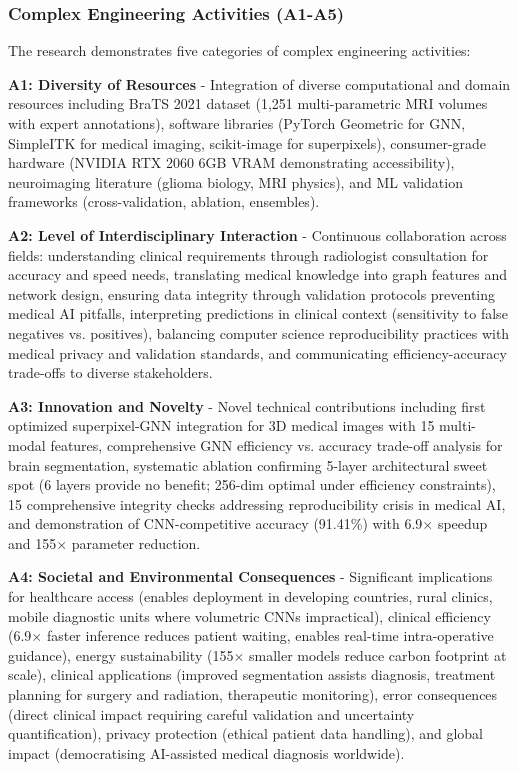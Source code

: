 \subsubsection{Complex Engineering Activities (A1-A5)}

The research demonstrates five categories of complex engineering activities:

\textbf{A1: Diversity of Resources} - Integration of diverse computational and domain resources including BraTS 2021 dataset (1,251 multi-parametric MRI volumes with expert annotations), software libraries (PyTorch Geometric for GNN, SimpleITK for medical imaging, scikit-image for superpixels), consumer-grade hardware (NVIDIA RTX 2060 6GB VRAM demonstrating accessibility), neuroimaging literature (glioma biology, MRI physics), and ML validation frameworks (cross-validation, ablation, ensembles).

\textbf{A2: Level of Interdisciplinary Interaction} - Continuous collaboration across fields: understanding clinical requirements through radiologist consultation for accuracy and speed needs, translating medical knowledge into graph features and network design, ensuring data integrity through validation protocols preventing medical AI pitfalls, interpreting predictions in clinical context (sensitivity to false negatives vs. positives), balancing computer science reproducibility practices with medical privacy and validation standards, and communicating efficiency-accuracy trade-offs to diverse stakeholders.

\textbf{A3: Innovation and Novelty} - Novel technical contributions including first optimized superpixel-GNN integration for 3D medical images with 15 multi-modal features, comprehensive GNN efficiency vs. accuracy trade-off analysis for brain segmentation, systematic ablation confirming 5-layer architectural sweet spot (6 layers provide no benefit; 256-dim optimal under efficiency constraints), 15 comprehensive integrity checks addressing reproducibility crisis in medical AI, and demonstration of CNN-competitive accuracy (91.41\%) with 6.9$\times$ speedup and 155$\times$ parameter reduction.

\textbf{A4: Societal and Environmental Consequences} - Significant implications for healthcare access (enables deployment in developing countries, rural clinics, mobile diagnostic units where volumetric CNNs impractical), clinical efficiency (6.9$\times$ faster inference reduces patient waiting, enables real-time intra-operative guidance), energy sustainability (155$\times$ smaller models reduce carbon footprint at scale), clinical applications (improved segmentation assists diagnosis, treatment planning for surgery and radiation, therapeutic monitoring), error consequences (direct clinical impact requiring careful validation and uncertainty quantification), privacy protection (ethical patient data handling), and global impact (democratising AI-assisted medical diagnosis worldwide).

